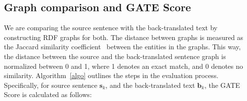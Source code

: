 \documentclass[runningheads]{llncs}
\begin{document}










\subsection{Graph comparison and GATE Score}

We are comparing the source sentence with the back-translated text by constructing RDF graphs for both. The distance between graphs is measured as the Jaccard similarity coefficient~\cite{jaccard} between the entities in the graphs. This way, the distance between the source and the back-translated sentence graph is normalized between 0 and 1, where 1 denotes an exact match, and 0 denotes no similarity. Algorithm~\ref{algo} outlines the steps in the evaluation process. Specifically, for source sentence $\mathbf{s}_k$, and the back-translated text $\mathbf{b}_k$, the GATE Score is calculated as follows:
\end{document}
